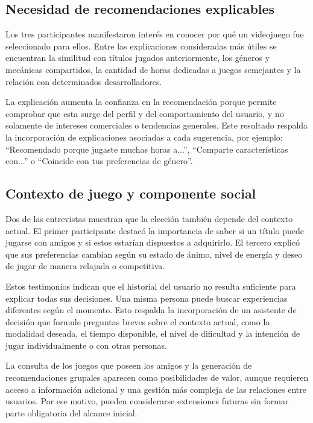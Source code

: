 \subsection{Necesidad de recomendaciones explicables}\label{subsec:necesidad_explicabilidad}

Los tres participantes manifestaron interés en conocer por qué un videojuego fue seleccionado para ellos. Entre las explicaciones consideradas más útiles se encuentran la similitud con títulos jugados anteriormente, los géneros y mecánicas compartidos, la cantidad de horas dedicadas a juegos semejantes y la relación con determinados desarrolladores.

La explicación aumenta la confianza en la recomendación porque permite comprobar que esta surge del perfil y del comportamiento del usuario, y no solamente de intereses comerciales o tendencias generales. Este resultado respalda la incorporación de explicaciones asociadas a cada sugerencia, por ejemplo: \enquote{Recomendado porque jugaste muchas horas a...}, \enquote{Comparte características con...} o \enquote{Coincide con tus preferencias de género}.

\subsection{Contexto de juego y componente social}\label{subsec:contexto_social}

Dos de las entrevistas muestran que la elección también depende del contexto actual. El primer participante destacó la importancia de saber si un título puede jugarse con amigos y si estos estarían dispuestos a adquirirlo. El tercero explicó que sus preferencias cambian según su estado de ánimo, nivel de energía y deseo de jugar de manera relajada o competitiva.

Estos testimonios indican que el historial del usuario no resulta suficiente para explicar todas sus decisiones. Una misma persona puede buscar experiencias diferentes según el momento. Esto respalda la incorporación de un asistente de decisión que formule preguntas breves sobre el contexto actual, como la modalidad deseada, el tiempo disponible, el nivel de dificultad y la intención de jugar individualmente o con otras personas.

La consulta de los juegos que poseen los amigos y la generación de recomendaciones grupales aparecen como posibilidades de valor, aunque requieren acceso a información adicional y una gestión más compleja de las relaciones entre usuarios. Por ese motivo, pueden considerarse extensiones futuras sin formar parte obligatoria del alcance inicial.


